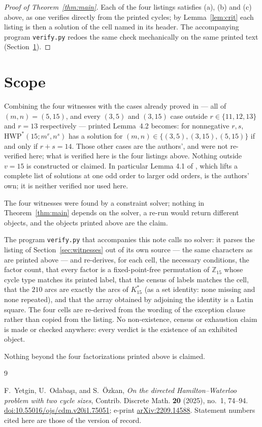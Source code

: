 \documentclass[11pt]{amsart}
\theoremstyle{remark}
\newcommand{\Kstar}{K^{*}}
\newcommand{\HWP}{\mathrm{HWP}^{*}}
\newcommand{\Zfif}{\mathbb{Z}_{15}}
\begin{document}
\begin{proof}[Proof of Theorem~\ref{thm:main}]
Each of the four listings satisfies (a), (b) and (c) above, as one verifies
directly from the printed cycles; by Lemma~\ref{lem:crit} each listing is then a
solution of the cell named in its header. The accompanying program
\texttt{verify.py} redoes the same check mechanically on the same printed text
(Section~\ref{sec:verif}).
\end{proof}

\section{Scope}\label{sec:verif}

Combining the four witnesses with the cases already proved in
\cite{YOO} --- all of $(m,n)=(5,15)$, and every $(3,5)$ and $(3,15)$ case outside
$r\in\{11,12,13\}$ and $r=13$ respectively --- printed Lemma~4.2 becomes: for
nonnegative $r,s$, $\HWP(15; m^{r}, n^{s})$ has a solution for
$(m,n)\in\{(3,5),(3,15),(5,15)\}$ if and only if $r+s=14$. Those other cases are
the authors', and were not re-verified here; what is verified here is the four
listings above. Nothing outside $v=15$ is constructed or claimed. In particular
Lemma 4.1 of \cite{YOO}, which lifts a complete list of solutions at one odd
order to larger odd orders, is the authors' own; it is neither verified nor used
here.

The four witnesses were found by a constraint solver; nothing in
Theorem~\ref{thm:main} depends on the solver, a re-run would return different
objects, and the objects printed above are the claim.

The program \texttt{verify.py} that accompanies this note calls no solver: it
parses the listing of Section~\ref{sec:witnesses} out of its own source --- the
same characters as are printed above --- and re-derives, for each cell, the
necessary conditions, the factor count, that every factor is a fixed-point-free
permutation of $\Zfif$ whose cycle type matches its printed label, that the
census of labels matches the cell, that the $210$ arcs are exactly the arcs of
$\Kstar_{15}$ (as a set identity: none missing and none repeated), and that the
array obtained by adjoining the identity is a Latin square. The four cells are
re-derived from the wording of the exception clause rather than copied from the
listing. No non-existence, census or exhaustion claim is made or checked
anywhere: every verdict is the existence of an exhibited object.

Nothing beyond the four
factorizations printed above is claimed.

\begin{thebibliography}{9}

F.~Yetgin, U.~Odaba\c{s}\i{}, and S.~\"Ozkan,
\emph{On the directed Hamilton--Waterloo problem with two cycle sizes},
Contrib. Discrete Math. \textbf{20} (2025), no.~1, 74--94.
\href{https://doi.org/10.55016/ojs/cdm.v20i1.75051}{doi:10.55016/ojs/cdm.v20i1.75051};
e-print \href{https://arxiv.org/abs/2209.14588}{arXiv:2209.14588}.
Statement numbers cited here are those of the version of record.

\end{thebibliography}
\end{document}
